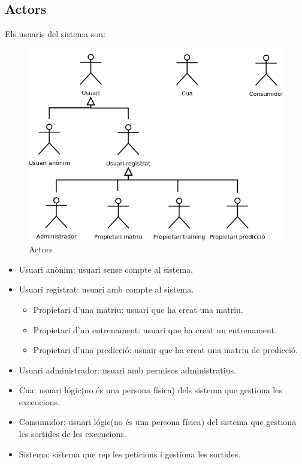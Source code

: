 \subsection{Actors}
Els usuaris del sistema son:
\begin{figure}[h]
  \centering
  \includegraphics[scale=0.4]{img/specification/Actors.png}
  \caption{Actors}
  \label{specification:actors}
\end{figure}
\begin{itemize}
\item Usuari an\`{o}nim: usuari sense compte al sistema.
\item Usuari registrat: usuari amb compte al sistema.
\begin{itemize}
\item Propietari d'una matriu: usuari que ha creat una matriu.
\item Propietari d'un entrenament: usuari que ha creat un entrenament.
\item Propietari d'una predicci\'{o}: usuair que ha creat una matriu de predicci\'{o}.
\end{itemize}
\item Usuari administrador: usuari amb permisos administratius.
\item Cua: usuari l\'{o}gic(no \'{e}s una persona f\'{i}sica) dels sistema que gestiona les execucions.
\item Consumidor: usuari l\'{o}gic(no \'{e}s una persona f\'{i}sica) del sistema que gestiona les sortides de les execucions.
\item Sistema: sistema que rep les peticions i gestiona les sortides.
\end{itemize}
